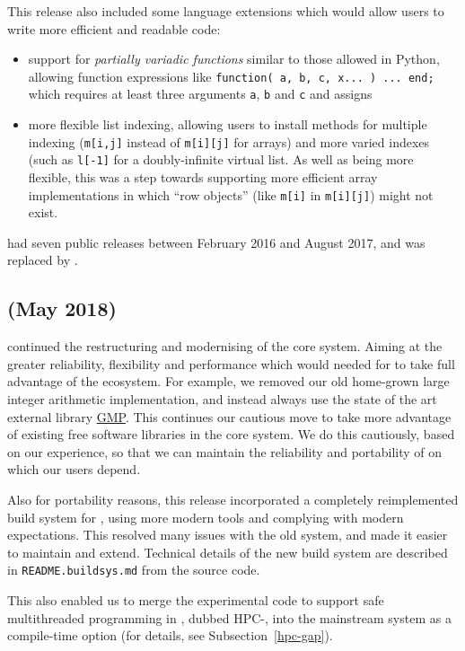 \documentclass{deliverablereport}
\begin{document}
This release also included some language extensions which would allow users to write
more efficient and readable code:
\begin{itemize}
  \item support for \emph{partially
  variadic functions} similar to those allowed in Python, allowing
function expressions like
\verb|function( a, b, c, x... ) ... end;|
which requires at least three arguments \verb|a|, \verb|b| and
\verb|c| and assigns
\item more flexible list indexing, allowing users to install methods
  for multiple indexing   (\verb|m[i,j]| instead of \verb|m[i][j]| for arrays) and more varied
  indexes (such as \verb|l[-1]| for a doubly-infinite virtual list. As
  well as being more flexible, this was a step towards supporting more
  efficient array implementations  in which ``row objects'' (like
  \verb|m[i]| in \verb|m[i][j]|) might not exist.
\end{itemize}

 had seven public releases between February 2016 and August 2017, and
was replaced by .

\subsection{ (May 2018)}\label{gap-4.9}

 continued the restructuring and modernising of the core \GAP
system. Aiming at the greater reliability, flexibility and performance
which would needed for \GAP to take full advantage of the \ODK ecosystem.
For example, we removed our old home-grown large integer arithmetic
implementation, and instead always 
use the state of the art external library \href{???}{GMP}. This
continues our cautious move to take more advantage of existing free
software libraries in the core system. We do this cautiously, based on
our experience,  so that we can maintain the reliability and
portability of \GAP on which our users depend.

Also for portability reasons, this release incorporated a  completely
reimplemented build system for \GAP, using more modern tools and
complying with modern expectations. This resolved many issues with the old
system, and made it easier to maintain and extend. Technical details
of the new build system are described in {\tt README.buildsys.md} from
the \GAP source code. 

This also enabled us to merge the experimental code to support safe multithreaded programming in \GAP, 
dubbed HPC-\GAP, into the mainstream \GAP system as a compile-time option (for details, see
Subsection~\ref{hpc-gap}).
\end{document}
